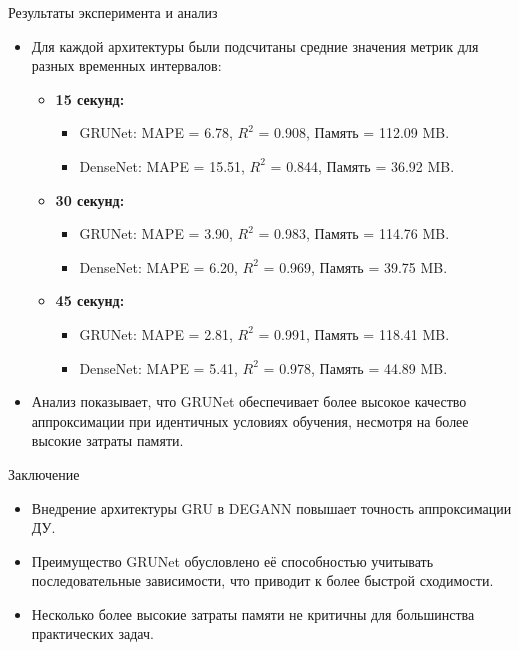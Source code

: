 \documentclass
  [ russian
  , aspectratio=1610 %
  ] {beamer}
\begin{document}
\begin{frame}{Результаты эксперимента и анализ}
    \begin{itemize}
        \item Для каждой архитектуры были подсчитаны средние значения метрик для разных временных интервалов:
              \begin{itemize}
                  \item \textbf{15 секунд:}
                        \begin{itemize}
                            \item GRUNet: MAPE = 6.78, \(R^2\) = 0.908, Память = 112.09 MB.
                            \item DenseNet: MAPE = 15.51, \(R^2\) = 0.844, Память = 36.92 MB.
                        \end{itemize}
                  \item \textbf{30 секунд:}
                        \begin{itemize}
                            \item GRUNet: MAPE = 3.90, \(R^2\) = 0.983, Память = 114.76 MB.
                            \item DenseNet: MAPE = 6.20, \(R^2\) = 0.969, Память = 39.75 MB.
                        \end{itemize}
                  \item \textbf{45 секунд:}
                        \begin{itemize}
                            \item GRUNet: MAPE = 2.81, \(R^2\) = 0.991, Память = 118.41 MB.
                            \item DenseNet: MAPE = 5.41, \(R^2\) = 0.978, Память = 44.89 MB.
                        \end{itemize}
              \end{itemize}
        \item Анализ показывает, что GRUNet обеспечивает более высокое качество аппроксимации при идентичных условиях обучения, несмотря на более высокие затраты памяти.
    \end{itemize}
\end{frame}

\begin{frame}{Заключение}
    \begin{itemize}
        \item Внедрение архитектуры GRU в DEGANN повышает точность аппроксимации ДУ.
        \item Преимущество GRUNet обусловлено её способностью учитывать последовательные зависимости, что приводит к более быстрой сходимости.
        \item Несколько более высокие затраты памяти не критичны для большинства практических задач.
    \end{itemize}
\end{frame}
\end{document}
